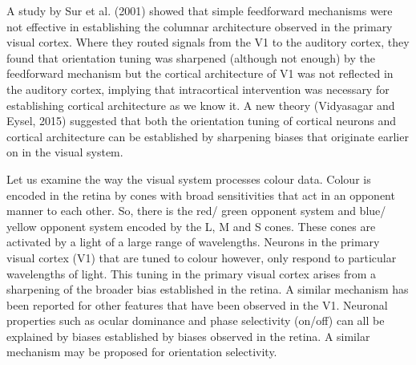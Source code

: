 	A study by Sur et al. (2001) showed that simple feedforward mechanisms were not effective in establishing the columnar architecture observed in the primary visual cortex. Where they routed signals from the V1 to the auditory cortex, they found that orientation tuning was sharpened (although not enough) by the feedforward mechanism but the cortical architecture of V1 was not reflected in the auditory cortex, implying that intracortical intervention was necessary for establishing cortical architecture as we know it. A new theory (Vidyasagar and Eysel, 2015) suggested that both the orientation tuning of cortical neurons and cortical architecture can be established by sharpening biases that originate earlier on in the visual system.
	
	
	Let us examine the way the visual system processes colour data. Colour is encoded in the retina by cones with broad sensitivities that act in an opponent manner to each other. So, there is the red/ green opponent system and blue/ yellow opponent system encoded by the L, M and S cones. These cones are activated by a light of a large range of wavelengths. Neurons in the primary visual cortex (V1) that are tuned to colour however, only respond to particular wavelengths of light. This tuning in the primary visual cortex arises from a sharpening of the broader bias established in the retina. A similar mechanism has been reported for other features that have been observed in the V1. Neuronal properties such as ocular dominance and phase selectivity (on/off) can all be explained by biases established by biases observed in the retina. A similar mechanism may be proposed for orientation selectivity.
	
